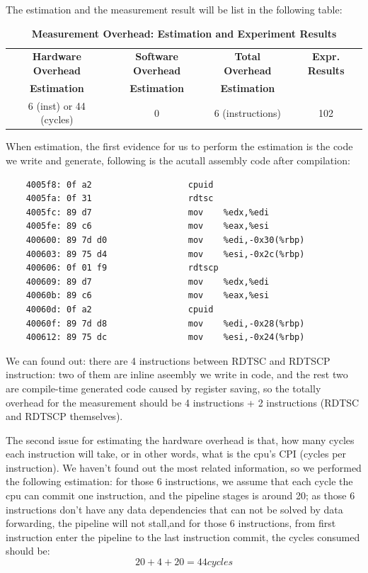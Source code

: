 The estimation and the measurement result will be list in the following table:

\begin{table}[ht]
  \centering
  \caption{\textbf{Measurement Overhead: Estimation and Experiment Results}}
  \begin{threeparttable}
  \begin{tabular}{cccc}
  \hline
      \textbf{Hardware Overhead} & \textbf{Software Overhead } & \textbf{Total Overhead} & \textbf{Expr. Results} \\
      \textbf{Estimation}       &  \textbf{Estimation}         & \textbf{Estimation}  &     \\
  \hline
  6 (inst) or 44 (cycles) & 0 & 6 (instructions) & 102 \\
  \hline
  \end{tabular}
  \end{threeparttable}
  \label{measurement_overhead_table}
\end{table}

When estimation, the first evidence for us to perform the estimation is the code we write and generate, following is the acutall assembly code after compilation:

\begin{lstlisting}
    4005f8:	0f a2                	cpuid
    4005fa:	0f 31                	rdtsc
    4005fc:	89 d7                	mov    %edx,%edi
    4005fe:	89 c6                	mov    %eax,%esi
    400600:	89 7d d0             	mov    %edi,-0x30(%rbp)
    400603:	89 75 d4             	mov    %esi,-0x2c(%rbp)
    400606:	0f 01 f9             	rdtscp
    400609:	89 d7                	mov    %edx,%edi
    40060b:	89 c6                	mov    %eax,%esi
    40060d:	0f a2                	cpuid
    40060f:	89 7d d8             	mov    %edi,-0x28(%rbp)
    400612:	89 75 dc             	mov    %esi,-0x24(%rbp)
\end{lstlisting}

We can found out: there are 4 instructions between RDTSC and RDTSCP instruction: two of them are inline aseembly we write in code, and the rest two are compile-time generated code caused by
register saving, so the totally overhead for the measurement should be 4 instructions + 2 instructions (RDTSC and RDTSCP themselves).

The second issue for estimating the hardware overhead is that, how many cycles each instruction will take, or in other words, what is the cpu's CPI (cycles per instruction). We haven't found out
the most related information, so we performed the following estimation: for those 6 instructions, we assume that each cycle the cpu can commit one instruction, and the pipeline stages is around 20;
as those 6 instructions don't have any data dependencies that can not be solved by data forwarding, the pipeline will not stall,and for those 6 instructions, from first instruction enter the pipeline
to the last instruction commit, the cycles consumed should be:
    $$ 20 + 4 + 20 = 44 cycles $$

